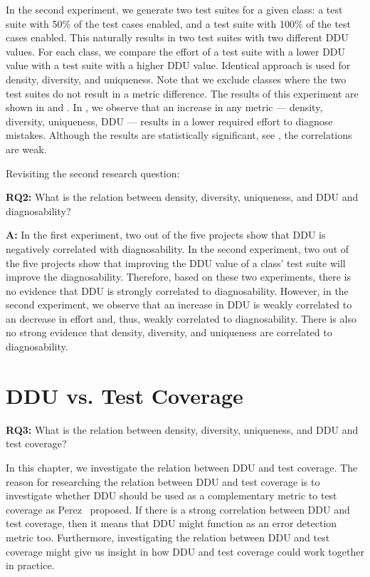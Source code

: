 \documentclass[twoside,a4paper,11pt]{memoir}
\begin{document}
In the second experiment, we generate two test suites for a given class: a test suite with 50\% of the test cases enabled, and a test suite with 100\% of the test cases enabled.
This naturally results in two test suites with two different DDU values.
For each class, we compare the effort of a test suite with a lower DDU value with a test suite with a higher DDU value.
Identical approach is used for density, diversity, and uniqueness.
Note that we exclude classes where the two test suites do not result in a metric difference.
The results of this experiment are shown in  and .
In , we observe that an increase in any metric --- density, diversity, uniqueness, DDU --- results in a lower required effort to diagnose mistakes.
Although the results are statistically significant, see , the correlations are weak.

Revisiting the second research question:
\begin{framed}
\noindent
\textbf{RQ2:} What is the relation between density, diversity, uniqueness, and DDU and diagnosability?
\end{framed}
\textbf{A:} In the first experiment, two out of the five projects show that DDU is negatively correlated with diagnosability.
In the second experiment, two out of the five projects show that improving the DDU value of a class' test suite will improve the diagnosability.
Therefore, based on these two experiments, there is no evidence that DDU is strongly correlated to diagnosability.
However, in the second experiment, we observe that an increase in DDU is weakly correlated to an decrease in effort and, thus, weakly correlated to diagnosability.
There is also no strong evidence that density, diversity, and uniqueness are correlated to diagnosability.

\chapter{DDU vs. Test Coverage}%
\label{ch:rq3}

\begin{framed}
\noindent
\textbf{RQ3:} What is the relation between density, diversity, uniqueness, and DDU and test coverage?
\end{framed}

In this chapter, we investigate the relation between DDU and test coverage.
The reason for researching the relation between DDU and test coverage is to investigate whether DDU should be used as a complementary metric to test coverage as Perez \etal\ proposed.
If there is a strong correlation between DDU and test coverage, then it means that DDU might function as an error detection metric too.
Furthermore, investigating the relation between DDU and test coverage might give us insight in how DDU and test coverage could work together in practice.
\end{document}
